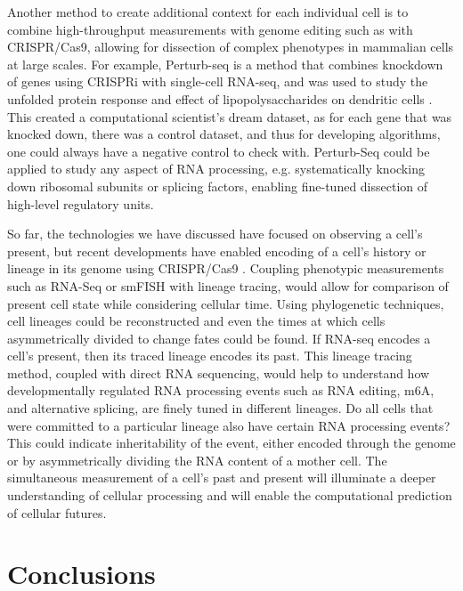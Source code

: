 Another method to create additional context for each individual cell is to combine high-throughput measurements with genome editing such as with CRISPR/Cas9, allowing for dissection of complex phenotypes in mammalian cells at large scales. For example, Perturb-seq is a method that combines knockdown of genes using CRISPRi with single-cell RNA-seq, and was used to study the unfolded protein response \cite{Adamson2016-nu} and effect of lipopolysaccharides on dendritic cells \cite{Dixit2016-sa}. This created a computational scientist's dream dataset, as for each gene that was knocked down, there was a control dataset, and thus for developing algorithms, one could always have a negative control to check with. Perturb-Seq could be applied to study any aspect of RNA processing, e.g. systematically knocking down ribosomal subunits or splicing factors, enabling fine-tuned dissection of high-level regulatory units.

So far, the technologies we have discussed have focused on observing a cell's present, but recent developments have enabled encoding of a cell's history or lineage in its genome using CRISPR/Cas9 \cite{Frieda2017-vv,McKenna2016-yi}. Coupling phenotypic measurements such as RNA-Seq or smFISH with lineage tracing, would allow for comparison of present cell state while considering cellular time. Using phylogenetic techniques, cell lineages could be reconstructed and even the times at which cells asymmetrically divided to change fates could be found. If RNA-seq encodes a cell's present, then its traced lineage encodes its past. This lineage tracing method, coupled with direct RNA sequencing, would help to understand how developmentally regulated RNA processing events such as RNA editing, m6A, and alternative splicing, are finely tuned in different lineages. Do all cells that were committed to a particular lineage also have certain RNA processing events? This could indicate inheritability of the event, either encoded through the genome or by asymmetrically dividing the RNA content of a mother cell. The simultaneous measurement of a cell's past and present will illuminate a deeper understanding of cellular processing and will enable the computational prediction of cellular futures.

\section{Conclusions}

